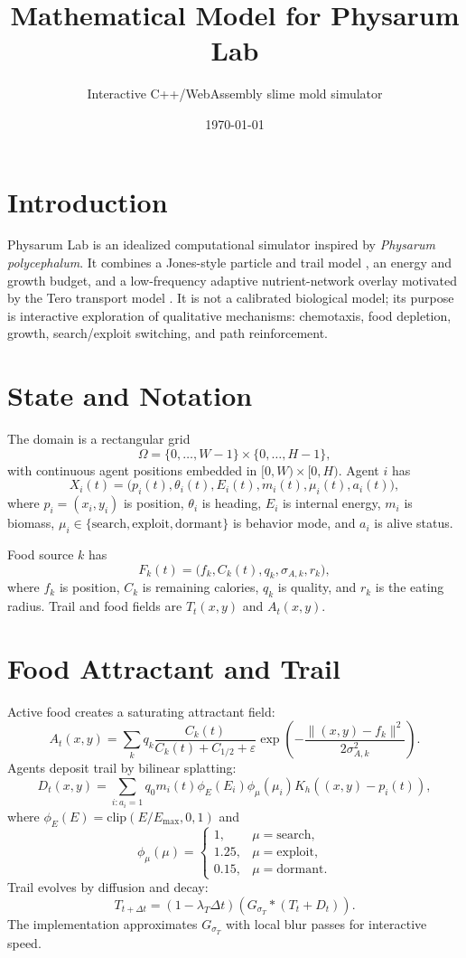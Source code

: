 \documentclass[11pt]{article}
\title{Mathematical Model for Physarum Lab}
\author{Interactive C++/WebAssembly slime mold simulator}
\date{\today}
\begin{document}
\maketitle

\section{Introduction}
Physarum Lab is an idealized computational simulator inspired by
\emph{Physarum polycephalum}. It combines a Jones-style particle and trail
model \citep{Jones2010Pattern}, an energy and growth budget, and a low-frequency
adaptive nutrient-network overlay motivated by the Tero transport model
\citep{Tero2007Adaptive}. It is not a calibrated biological model; its purpose
is interactive exploration of qualitative mechanisms: chemotaxis, food
depletion, growth, search/exploit switching, and path reinforcement.

\section{State and Notation}
The domain is a rectangular grid
\[
  \Omega=\{0,\dots,W-1\}\times\{0,\dots,H-1\},
\]
with continuous agent positions embedded in $[0,W)\times[0,H)$. Agent $i$ has
\[
X_i(t)=\bigl(p_i(t),\theta_i(t),E_i(t),m_i(t),\mu_i(t),a_i(t)\bigr),
\]
where $p_i=(x_i,y_i)$ is position, $\theta_i$ is heading, $E_i$ is internal
energy, $m_i$ is biomass, $\mu_i\in\{\mathrm{search},\mathrm{exploit},
\mathrm{dormant}\}$ is behavior mode, and $a_i$ is alive status.

Food source $k$ has
\[
F_k(t)=\bigl(f_k,C_k(t),q_k,\sigma_{A,k},r_k\bigr),
\]
where $f_k$ is position, $C_k$ is remaining calories, $q_k$ is quality, and
$r_k$ is the eating radius. Trail and food fields are $T_t(x,y)$ and
$A_t(x,y)$.

\section{Food Attractant and Trail}
Active food creates a saturating attractant field:
\[
A_t(x,y)=\sum_k q_k
\frac{C_k(t)}{C_k(t)+C_{1/2}+\varepsilon}
\exp\left(-\frac{\|(x,y)-f_k\|^2}{2\sigma_{A,k}^2}\right).
\]
Agents deposit trail by bilinear splatting:
\[
D_t(x,y)=\sum_{i:a_i=1}q_0m_i(t)\phi_E(E_i)\phi_\mu(\mu_i)K_h((x,y)-p_i(t)),
\]
where $\phi_E(E)=\mathrm{clip}(E/E_{\max},0,1)$ and
\[
\phi_\mu(\mu)=
\begin{cases}
1, & \mu=\mathrm{search},\\
1.25, & \mu=\mathrm{exploit},\\
0.15, & \mu=\mathrm{dormant}.
\end{cases}
\]
Trail evolves by diffusion and decay:
\[
T_{t+\Delta t}=(1-\lambda_T\Delta t)\left(G_{\sigma_T}*(T_t+D_t)\right).
\]
The implementation approximates $G_{\sigma_T}$ with local blur passes for
interactive speed.
\end{document}
